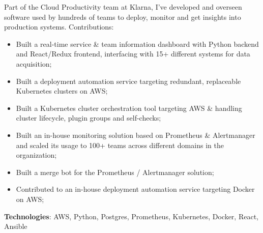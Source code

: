 \documentclass[12pt,legalpaper,sans]{moderncv}
\begin{document}
    {\begin{minipage}[t]{\linewidth}\small{Part of the Cloud Productivity team at Klarna, I've developed and overseen software used by hundreds of teams to deploy, monitor and get insights into production systems.\newline{}
    Contributions:
        \begin{itemize}
            \item Built a real-time service \& team information dashboard with Python backend and React/Redux frontend, interfacing with 15+ different systems for data acquisition;
            \item Built a deployment automation service targeting redundant, replaceable Kubernetes clusters on AWS;
            \item Built a Kubernetes cluster orchestration tool targeting AWS \& handling cluster lifecycle, plugin groups and self-checks;
            \item Built an in-house monitoring solution based on Prometheus \& Alertmanager and scaled its usage to 100+ teams across different domains in the organization;
            \item Built a merge bot for the Prometheus / Alertmanager solution;
            \item Contributed to an in-house deployment automation service targeting Docker on AWS;
        \end{itemize}
        \textbf{Technologies}: AWS, Python, Postgres, Prometheus, Kubernetes, Docker, React, Ansible\newline}\end{minipage}}
\end{document}
